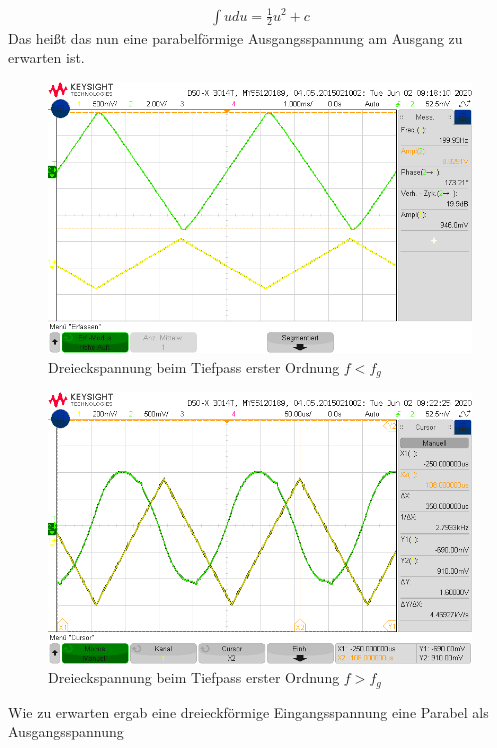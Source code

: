 \begin{align}
    \int{u du} = \frac{1}{2} u^2 + c
\end{align}
Das heißt das nun eine parabelförmige Ausgangsspannung am Ausgang zu erwarten ist.

\begin{figure}[H]
    \centering
    \includegraphics[width=\costumPicWidth]{Lab_2/Messungen/TP_first_order/scope_30.png}
    \caption{Dreieckspannung beim Tiefpass erster Ordnung $f < f_g$}
    \label{fig:Dreieck_Tiefpass_erster_Ordnung_small_f}
\end{figure}
\begin{figure}[H]
    \centering
    \includegraphics[width=\costumPicWidth]{Lab_2/Messungen/TP_first_order/scope_34.png}
    \caption{Dreieckspannung beim Tiefpass erster Ordnung $f > f_g$}
    \label{fig:Dreieck_Tiefpass_erster_Ordnung_big_f}
\end{figure}
Wie zu erwarten ergab eine dreieckförmige Eingangsspannung eine Parabel als Ausgangsspannung
